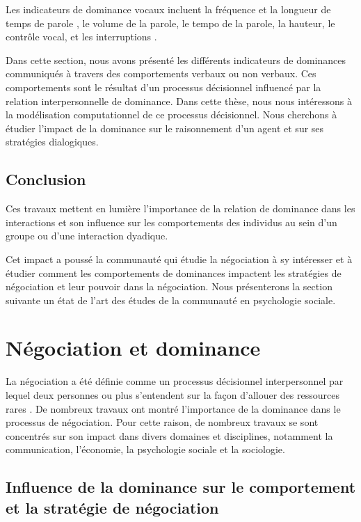 			Les indicateurs de dominance vocaux incluent la fréquence et la longueur de temps de parole \cite{mast2002dominance}, le volume de la parole, le tempo de la parole, la hauteur, le contrôle vocal, et les interruptions \cite{dunbar2005perceptions}.
		
		Dans cette section, nous avons présenté les différents indicateurs de dominances communiqués à travers des comportements verbaux ou non verbaux. Ces comportements sont le résultat d'un processus décisionnel influencé par la relation interpersonnelle de dominance. Dans cette thèse, nous nous intéressons à la modélisation computationnel de ce processus décisionnel. Nous cherchons à étudier l'impact de la dominance sur le raisonnement d'un agent et sur ses stratégies dialogiques. 
		
		\subsection{Conclusion}
			
			Ces travaux mettent en lumière l'importance de la relation de dominance dans les interactions et son influence sur les comportements des individus au sein d'un groupe ou d'une interaction dyadique.
			
			Cet impact a poussé la communauté qui étudie la négociation à sy intéresser et à étudier comment les comportements de dominances impactent les stratégies de négociation et leur pouvoir dans la négociation. 
			Nous présenterons la section suivante un état de l'art des études de la communauté en psychologie sociale.
			
			
	\section{Négociation et dominance}
	
	La négociation a été définie comme un processus décisionnel interpersonnel par lequel deux personnes ou plus s'entendent sur la façon d'allouer des ressources rares \cite{thompson2000mind}. De nombreux travaux \cite{de1995impact,van2006power,fiske1993controlling} ont montré l'importance de la dominance dans le processus de négociation. Pour cette raison, de nombreux travaux se sont concentrés sur son impact dans divers domaines et disciplines, notamment la communication, l'économie, la psychologie sociale et la sociologie.
	

	
	\subsection{Influence de la dominance sur le comportement et la stratégie de négociation}
	
